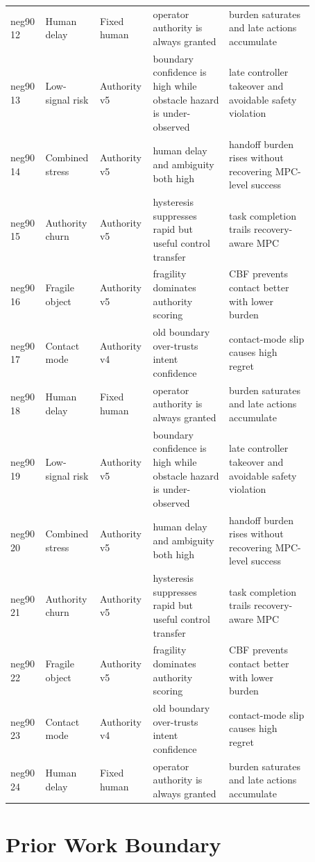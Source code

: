 \documentclass{article}
\begin{document}
\begin{center}
\begin{longtable}{@{}p{0.08\linewidth}p{0.14\linewidth}p{0.14\linewidth}p{0.24\linewidth}p{0.27\linewidth}@{}}
neg90 12 & Human delay & Fixed human & operator authority is always granted & burden saturates and late actions accumulate\\
neg90 13 & Low-signal risk & Authority v5 & boundary confidence is high while obstacle hazard is under-observed & late controller takeover and avoidable safety violation\\
neg90 14 & Combined stress & Authority v5 & human delay and ambiguity both high & handoff burden rises without recovering MPC-level success\\
neg90 15 & Authority churn & Authority v5 & hysteresis suppresses rapid but useful control transfer & task completion trails recovery-aware MPC\\
neg90 16 & Fragile object & Authority v5 & fragility dominates authority scoring & CBF prevents contact better with lower burden\\
neg90 17 & Contact mode & Authority v4 & old boundary over-trusts intent confidence & contact-mode slip causes high regret\\
neg90 18 & Human delay & Fixed human & operator authority is always granted & burden saturates and late actions accumulate\\
neg90 19 & Low-signal risk & Authority v5 & boundary confidence is high while obstacle hazard is under-observed & late controller takeover and avoidable safety violation\\
neg90 20 & Combined stress & Authority v5 & human delay and ambiguity both high & handoff burden rises without recovering MPC-level success\\
neg90 21 & Authority churn & Authority v5 & hysteresis suppresses rapid but useful control transfer & task completion trails recovery-aware MPC\\
neg90 22 & Fragile object & Authority v5 & fragility dominates authority scoring & CBF prevents contact better with lower burden\\
neg90 23 & Contact mode & Authority v4 & old boundary over-trusts intent confidence & contact-mode slip causes high regret\\
neg90 24 & Human delay & Fixed human & operator authority is always granted & burden saturates and late actions accumulate\\
\bottomrule
\end{longtable}
\normalsize
\end{center}

\section{Prior Work Boundary}
\end{document}
